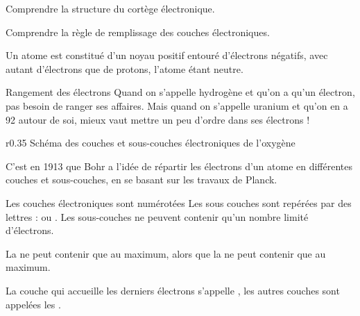 \teteSndAtom

\vspace*{-36pt}

\begin{objectifs}
  \item Comprendre la structure du cortège électronique.
  \item Comprendre la règle de remplissage des couches électroniques.
\end{objectifs}

\begin{contexte}
  Un atome est constitué d'un noyau positif entouré d'électrons négatifs, avec autant d'électrons que de protons, l'atome étant neutre.
  
\end{contexte}


\begin{doc}{Rangement des électrons}
  Quand on s'appelle hydrogène et qu'on a qu'un électron, pas besoin de ranger ses affaires.
  Mais quand on s'appelle uranium et qu'on en a 92 autour de soi, mieux vaut mettre un peu d'ordre dans ses électrons !
  
  \begin{wrapfigure}{r}{0.35\linewidth}
    \centering
    \vspace*{-24pt}
    {\small Schéma des couches et sous-couches électroniques de l'oxygène }
  \end{wrapfigure}
  
  C'est en 1913 que Bohr a l'idée de répartir les électrons d'un atome en différentes couches et sous-couches, en se basant sur les travaux de Planck.
  
  Les couches électroniques sont numérotées 
  Les sous couches sont repérées par des lettres :  ou .
  Les sous-couches ne peuvent contenir qu'un nombre limité d'électrons.

  \begin{importants}  
    La  ne peut contenir que  au maximum,
    alors que la  ne peut contenir que  au maximum.
  \end{importants}
  
  La couche qui accueille les derniers électrons s'appelle , les autres couches sont appelées les .
\end{doc}

